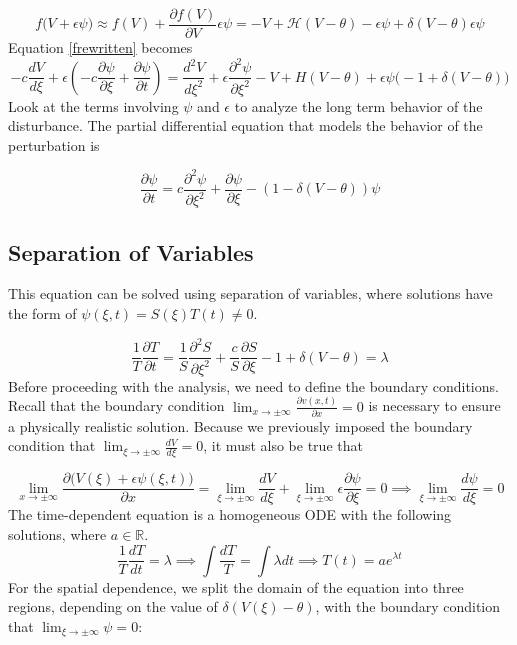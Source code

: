 \documentclass[12pt]{article}
\begin{document}
$$f\big(V+\epsilon\psi \big) \approx f(V) + \frac{\partial f(V)}{\partial V}\epsilon\psi = -V +\mathcal{H}(V-\theta) - \epsilon\psi + \delta(V-\theta)\epsilon\psi $$
Equation \ref{frewritten} becomes
$$-c\frac{dV}{d\xi}+\epsilon(-c\frac{\partial \psi}{\partial \xi}+\frac{\partial \psi}{\partial t})= 
\frac{d^2V}{d\xi^2}+\epsilon\frac{\partial^2\psi}{\partial\xi^2}-V+H(V-\theta)+\epsilon\psi\big(-1+\delta(V-\theta)\big)$$
Look at the terms involving $\psi$ and $\epsilon$ to analyze the long term behavior of the disturbance. The partial differential equation that models the behavior of the perturbation is

\begin{equation} \label{pde_nh}
\frac{\partial \psi}{\partial t} = c \frac{\partial^2\psi}{\partial\xi^2} + \frac{\partial\psi}{\partial\xi} - (1 - \delta(V-\theta))\psi
\end{equation} 


\subsection{Separation of Variables}

This equation can be solved using separation of variables, where solutions have the form of $\psi(\xi,t)=S(\xi)T(t)\neq0$.

$$ \frac{1}{T}\frac{\partial T}{\partial t} = \frac{1}{S}\frac{\partial^2S}{\partial\xi^2} + \frac{c}{S}\frac{\partial S}{\partial\xi} - 1 + \delta(V-\theta)= \lambda $$
Before proceeding with the analysis, we need to define the boundary conditions. Recall that the boundary condition $\lim_{x\to\pm\infty} \frac{\partial v(x,t)}{\partial x}=0$ is necessary to ensure a physically realistic solution. Because we previously imposed the boundary condition that $\lim_{\xi\to\pm\infty} \frac{dV}{d\xi}=0$, it must also be true that 

$$\lim_{x\to\pm\infty} \frac{\partial \big(V(\xi)+\epsilon\psi(\xi,t)\big)}{\partial x} = \lim_{\xi\to\pm\infty} \frac{dV}{d\xi}+\lim_{\xi\to\pm\infty} \epsilon\frac{\partial\psi}{\partial\xi}=0 \implies \lim_{\xi\to\pm\infty}\frac{d\psi}{d\xi}=0 $$
The time-dependent equation is a homogeneous ODE with the following solutions, where $a\in\mathbb{R}$.
\begin{equation} \label{timeeq}
\frac{1}{T}\frac{dT}{dt} = \lambda \implies \int\frac{dT}{T} = \int\lambda dt \implies T(t)=ae^{\lambda t}
\end{equation}
For the spatial dependence, we split the domain of the equation into three regions, depending on the value of $\delta(V(\xi)-\theta)$, with the boundary condition that $\lim_{\xi \to \pm \infty}\psi = 0$:
\end{document}
